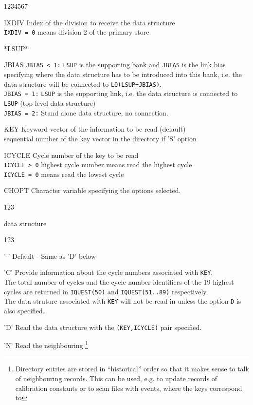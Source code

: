 \Idesc
\begin{DLtt}{1234567}
\item[IXDIV]Index of the division to receive the data structure\\
{\tt IXDIV = 0} means division 2 of the primary store
\item[*LSUP*]
\item[JBIAS]{\tt JBIAS < 1:} {\tt LSUP} is the supporting bank
and {\tt JBIAS} is the link bias specifying where the data structure 
has to be introduced into this bank, i.e. the data structure will 
be connected to {\tt LQ(LSUP+JBIAS)}.\\
{\tt JBIAS = 1:}
{\tt LSUP} is the supporting link, i.e. the data structure
is connected to {\tt LSUP} (top level data structure)\\
{\tt JBIAS = 2:} Stand alone data structure, no connection.
\item[KEY]Keyword vector of the information to be read (default)\\
sequential number of the key vector in the directory if 'S' option
\item[ICYCLE]Cycle number of the key to be read\\
{\tt ICYCLE > 0} highest cycle number means read the highest cycle\\
{\tt ICYCLE = 0} means read the lowest cycle
\item[CHOPT]Character variable specifying the options selected.
\begin{DLtt}{123}
\item[{\rm data structure}] \mbox{ }
\begin{DLtt}{123}
\item[' ']Default - Same as 'D' below
\item['C']Provide information about the cycle numbers associated 
with {\tt KEY}.\\
The total number of cycles and the cycle number identifiers
of the 19 highest cycles are returned in {\tt IQUEST(50)} and
{\tt IQUEST(51..89)} respectively. \\
The data struture associated with {\tt KEY} will not be read
in unless the option {\tt D} is also specified.
\item['D']Read the data structure with the {\tt (KEY,ICYCLE)} pair specified.
\item['N']Read the neighbouring
\footnote{
Directory entries are stored in ``historical'' order so that it
makes sense to talk of neighbouring records.
This can be used, e.g. to update records of calibration
constants or to scan files with events, where the keys correspond to
}
\end{DLtt}
\end{DLtt}
\end{DLtt}
